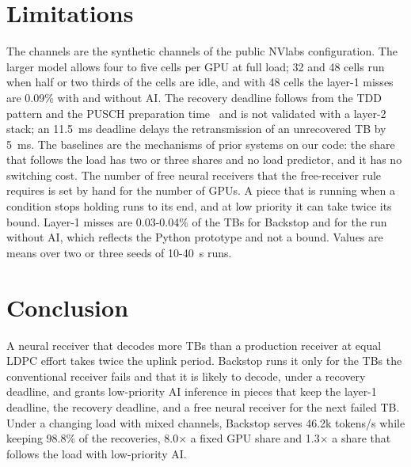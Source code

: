 \documentclass[acmsmall,screen,review,anonymous]{acmart}
\newcommand{\sys}{Backstop\xspace}
\begin{document}
\section{Limitations}

The channels are the synthetic channels of the public NVlabs configuration. The larger model allows four to
five cells per GPU at full load; 32 and 48 cells run when half or two thirds of the cells are idle, and
with 48 cells the layer-1 misses are 0.09\% with and without AI. The recovery deadline follows from the TDD
pattern and the PUSCH preparation time~\cite{ts38214} and is not validated with a layer-2 stack; an 11.5~ms
deadline delays the retransmission of an unrecovered TB by 5~ms. The baselines are the mechanisms of prior
systems on our code: the share that follows the load has two or three shares and no load predictor, and it
has no switching cost. The number of free neural receivers that the free-receiver rule requires is set by
hand for the number of GPUs. A piece that is running when a condition stops holding runs to its end, and at
low priority it can take twice its bound. Layer-1 misses are 0.03-0.04\% of the TBs for \sys and for the run
without AI, which reflects the Python prototype and not a bound. Values are means over two or three seeds
of 10-40~s runs.

\section{Conclusion}

A neural receiver that decodes more TBs than a production receiver at equal LDPC effort takes twice the
uplink period. \sys runs it only for the TBs the conventional receiver fails and that it is likely to
decode, under a recovery deadline, and grants low-priority AI inference in pieces that keep the layer-1
deadline, the recovery deadline, and a free neural receiver for the next failed TB. Under a changing load
with mixed channels, \sys serves 46.2k tokens/s while keeping 98.8\% of the recoveries, 8.0$\times$ a fixed
GPU share and 1.3$\times$ a share that follows the load with low-priority AI.



\end{document}
